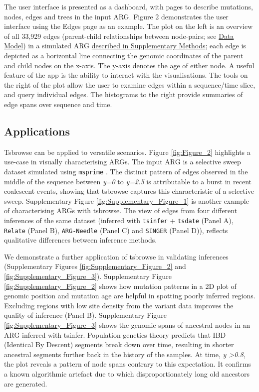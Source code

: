 \documentclass[unnumsec,webpdf,contemporary,large,namedate]{oup-authoring-template}%
\begin{document}
The user interface is presented as a dashboard, with pages to
describe mutations, nodes, edges and trees in the input ARG. Figure 2
demonstrates the user interface using the Edges page as an example. The plot on
the left is an overview of all 33,929 edges (parent-child relationships between
node-pairs; see \hyperref[subsec:Data_Model]{Data Model}) in a simulated ARG
\hyperref[subsec:sweep_simulation]{described in Supplementary Methods}; each
edge is depicted as a horizontal line connecting the genomic coordinates of the
parent and child nodes on the x-axis. The y-axis denotes the age of either
node. A useful feature of the app is the ability to interact with the
visualisations. The tools on the right of the plot allow the user to examine
edges within a sequence/time slice, and query individual edges. The histograms
to the right provide summaries of edge spans over sequence and time.


\subsection{Applications}

 Tsbrowse can be applied to versatile scenarios. Figure \ref{fig:Figure_2}
highlights a use-case in visually characterising ARGs. The input ARG is a
selective sweep dataset simulated using \texttt{msprime}
\citep{baumdicker2022efficient}. The distinct pattern of edges observed in the middle of
the sequence between \textit{y=0} to \textit{y=2.5} is attributable to a burst
in recent coalescent events, showing that tsbrowse captures this characteristic
of a selective sweep. Supplementary Figure \ref{fig:Supplementary_Figure_1} is
another example of characterising ARGs with tsbrowse. The view of edges from
four different inferences of the same dataset (inferred with \texttt{tsinfer} +
\texttt{tsdate} (Panel A), \texttt{Relate} (Panel B), \texttt{ARG-Needle}
(Panel C) and \texttt{SINGER} (Panel D)), reflects qualitative differences
between inference methods. 

We demonstrate a further application of tsbrowse in validating inferences
(Supplementary Figures \ref{fig:Supplementary_Figure_2} and
\ref{fig:Supplementary_Figure_3}). Supplementary Figure
\ref{fig:Supplementary_Figure_2} shows how mutation patterns in a 2D plot of
genomic position and mutation age are helpful in spotting poorly inferred
regions. Excluding regions with low site density from the variant data improves
the quality of inference (Panel B). Supplementary Figure
\ref{fig:Supplementary_Figure_3} shows the genomic spans of ancestral nodes in
an ARG inferred with tsinfer. Population genetics theory predicts that IBD
(Identical By Descent) segments break down over time, resulting in shorter
ancestral segments further back in the history of the samples. At time,
\textit{y \textgreater{0.8}}, the plot reveals a pattern of node spans contrary
to this expectation. It confirms a known algorithmic artefact due to which
disproportionately long old ancestors are generated.
\end{document}
